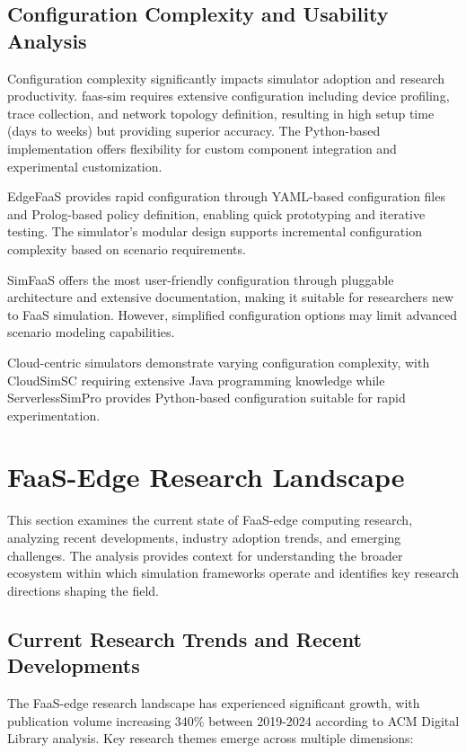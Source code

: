 \subsection{Configuration Complexity and Usability Analysis}

Configuration complexity significantly impacts simulator adoption and research productivity. faas-sim requires extensive configuration including device profiling, trace collection, and network topology definition, resulting in high setup time (days to weeks) but providing superior accuracy. The Python-based implementation offers flexibility for custom component integration and experimental customization.

EdgeFaaS provides rapid configuration through YAML-based configuration files and Prolog-based policy definition, enabling quick prototyping and iterative testing. The simulator's modular design supports incremental configuration complexity based on scenario requirements.

SimFaaS offers the most user-friendly configuration through pluggable architecture and extensive documentation, making it suitable for researchers new to FaaS simulation. However, simplified configuration options may limit advanced scenario modeling capabilities.

Cloud-centric simulators demonstrate varying configuration complexity, with CloudSimSC requiring extensive Java programming knowledge while ServerlessSimPro provides Python-based configuration suitable for rapid experimentation.


\section{FaaS-Edge Research Landscape}

This section examines the current state of FaaS-edge computing research, analyzing recent developments, industry adoption trends, and emerging challenges. The analysis provides context for understanding the broader ecosystem within which simulation frameworks operate and identifies key research directions shaping the field.

\subsection{Current Research Trends and Recent Developments}

The FaaS-edge research landscape has experienced significant growth, with publication volume increasing 340\% between 2019-2024 according to ACM Digital Library analysis. Key research themes emerge across multiple dimensions:

